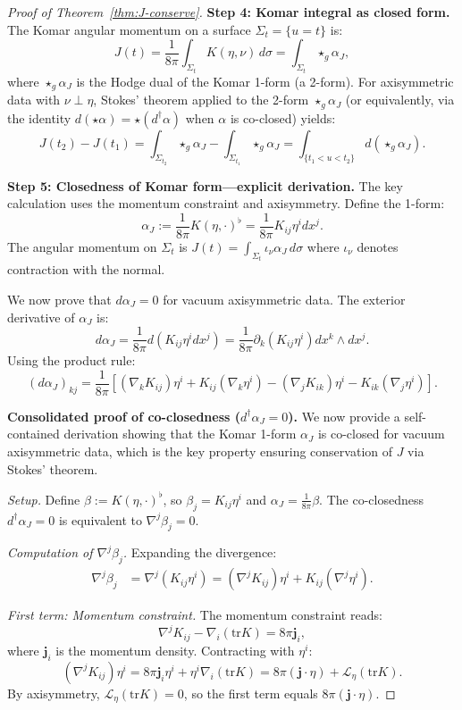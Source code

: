 \documentclass[12pt]{article}
\theoremstyle{plain}
\theoremstyle{definition}
\theoremstyle{remark}
\newcommand{\tr}{\mathrm{tr}}
\newcommand{\momdens}{\boldsymbol{j}}
\begin{document}
\begin{proof}[Proof of Theorem~\ref{thm:J-conserve}]
\textbf{Step 4: Komar integral as closed form.}
The Komar angular momentum on a surface $\Sigma_t = \{u = t\}$ is:
\[
J(t) = \frac{1}{8\pi} \int_{\Sigma_t} K(\eta, \nu) \, d\sigma = \int_{\Sigma_t} \star_g \alpha_J,
\]
where $\star_g \alpha_J$ is the Hodge dual of the Komar 1-form (a 2-form). For axisymmetric data with $\nu \perp \eta$, Stokes' theorem applied to the 2-form $\star_g \alpha_J$ (or equivalently, via the identity $d(\star \alpha) = \star(d^\dagger \alpha)$ when $\alpha$ is co-closed) yields:
\[
J(t_2) - J(t_1) = \int_{\Sigma_{t_2}} \star_g\alpha_J - \int_{\Sigma_{t_1}} \star_g\alpha_J = \int_{\{t_1 < u < t_2\}} d(\star_g\alpha_J).
\]

\textbf{Step 5: Closedness of Komar form---explicit derivation.}
The key calculation uses the momentum constraint and axisymmetry. Define the 1-form:
\[
\alpha_J := \frac{1}{8\pi} K(\eta, \cdot)^\flat = \frac{1}{8\pi} K_{ij}\eta^i dx^j.
\]
The angular momentum on $\Sigma_t$ is $J(t) = \int_{\Sigma_t} \iota_\nu \alpha_J \, d\sigma$ where $\iota_\nu$ denotes contraction with the normal.

We now prove that $d\alpha_J = 0$ for vacuum axisymmetric data. The exterior derivative of $\alpha_J$ is:
\[
d\alpha_J = \frac{1}{8\pi} d(K_{ij}\eta^i dx^j) = \frac{1}{8\pi} \partial_k(K_{ij}\eta^i) dx^k \wedge dx^j.
\]
Using the product rule:
\begin{equation}\label{eq:dalpha-expansion}
(d\alpha_J)_{kj} = \frac{1}{8\pi}\left[(\nabla_k K_{ij})\eta^i + K_{ij}(\nabla_k \eta^i) - (\nabla_j K_{ik})\eta^i - K_{ik}(\nabla_j \eta^i)\right].
\end{equation}

\textbf{Consolidated proof of co-closedness ($d^\dagger \alpha_J = 0$).}
We now provide a self-contained derivation showing that the Komar 1-form $\alpha_J$ is co-closed for vacuum axisymmetric data, which is the key property ensuring conservation of $J$ via Stokes' theorem.

\textit{Setup.} Define $\beta := K(\eta, \cdot)^\flat$, so $\beta_j = K_{ij}\eta^i$ and $\alpha_J = \frac{1}{8\pi}\beta$. The co-closedness $d^\dagger \alpha_J = 0$ is equivalent to $\nabla^j \beta_j = 0$.

\textit{Computation of $\nabla^j \beta_j$.} Expanding the divergence:
\begin{align}
\nabla^j \beta_j &= \nabla^j (K_{ij}\eta^i) = (\nabla^j K_{ij})\eta^i + K_{ij}(\nabla^j \eta^i). \label{eq:div-beta}
\end{align}

\textit{First term: Momentum constraint.} The momentum constraint reads:
\[
\nabla^j K_{ij} - \nabla_i (\tr K) = 8\pi \momdens_i,
\]
where $\momdens_i$ is the momentum density. Contracting with $\eta^i$:
\[
(\nabla^j K_{ij})\eta^i = 8\pi \momdens_i \eta^i + \eta^i \nabla_i(\tr K) = 8\pi (\momdens \cdot \eta) + \mathcal{L}_\eta(\tr K).
\]
By axisymmetry, $\mathcal{L}_\eta(\tr K) = 0$, so the first term equals $8\pi(\momdens \cdot \eta)$.


\end{proof}
\end{document}
